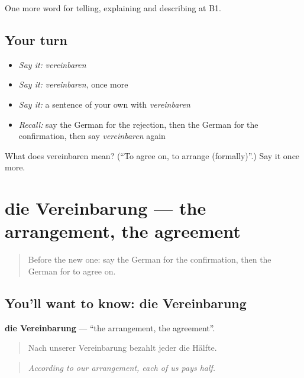 \begin{grammarlens}[title={What you've built}]
One more word for telling, explaining and describing at B1.
\end{grammarlens}

\subsection*{Your turn}
\begin{itemize}
\raggedright
  \item \emph{Say it:} \emph{vereinbaren}
  \item \emph{Say it:} \emph{vereinbaren}, once more
  \item \emph{Say it:} a sentence of your own with \emph{vereinbaren}
  \item \emph{Recall:} say the German for the rejection, then the German for the confirmation, then say \emph{vereinbaren} again
\end{itemize}

\begin{tcolorbox}[breakable,colback=teal!4,colframe=teal!35!black,title={Before you move on}]
What does vereinbaren mean? (\textquotedblleft{}To agree on, to arrange (formally)\textquotedblright{}.) Say it once more.
\end{tcolorbox}
\section[die Vereinbarung]{die Vereinbarung — the arrangement, the agreement}

\label{lesson:GE-C372-vereinbarung}



\begin{quote}
Before the new one: say the German for the confirmation, then the German for to agree on.
\end{quote}

\subsection*{You'll want to know: die Vereinbarung}
\textbf{die Vereinbarung} — \textquotedblleft{}the arrangement, the agreement\textquotedblright{}.

\begin{quote}
Nach unserer Vereinbarung bezahlt jeder die Hälfte.
\end{quote}

\begin{quote}
\emph{According to our arrangement, each of us pays half.}
\end{quote}

